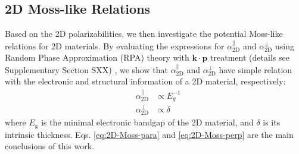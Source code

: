 \documentclass[journal=ancac3,manuscript=article,email=true,hyperref=true,keywords=false]{achemso}
\begin{document}
\subsection{2D Moss-like  Relations}
\label{sec:first-principles}
Based on the 2D polarizabilities, we then investigate the potential
Moss-like relations for 2D materials. By evaluating the expressions
for $\alpha_{\mathrm{2D}}^{\parallel}$ and
$\alpha_{\mathrm{2D}}^{\perp}$ using Random Phase Approximation (RPA)
theory \cite{Adler_1962} with $\mathbf{k} \cdot \mathbf{p}$
treatment\cite{kittel_2005_introduction} (details see Supplementary
Section SXX) , we show that
$\alpha_{\mathrm{2D}}^{\parallel}$ and $\alpha_{\mathrm{2D}}^{\perp}$
have simple relation with the electronic  and structural information of a 2D
material, respectively:
\begin{subequations}
\begin{eqnarray}
\label{eq:2D-Moss-para}
  &\alpha_{\mathrm{2D}}^{\parallel} &\propto E_{g}^{-1} \\
  \label{eq:2D-Moss-perp}
  &\alpha_{\mathrm{2D}}^{\perp} & \propto \delta
\end{eqnarray}
\end{subequations}
where $E_{\mathrm{g}}$ is the minimal electronic bandgap of the 2D
material, and $\delta$ is its intrinsic
thickness. Eqs. \ref{eq:2D-Moss-para} and \ref{eq:2D-Moss-perp} are
the main conclusions of this work.
\end{document}
